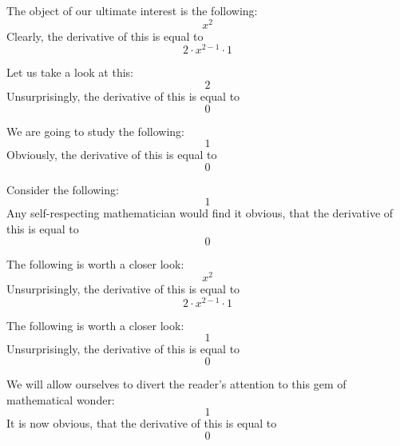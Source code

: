 \documentclass{article}
\begin{document}
The object of our ultimate interest is the following:
\begin{equation}
x ^{2 } 
\end{equation}
Clearly, the derivative of this is equal to
\begin{equation}
2 \cdot x ^{2 - 1 } \cdot 1 
\end{equation}

Let us take a look at this:
\begin{equation}
2 
\end{equation}
Unsurprisingly, the derivative of this is equal to
\begin{equation}
0 
\end{equation}

We are going to study the following:
\begin{equation}
1 
\end{equation}
Obviously, the derivative of this is equal to
\begin{equation}
0 
\end{equation}

Consider the following:
\begin{equation}
1 
\end{equation}
Any self-respecting mathematician would find it obvious, that the derivative of this is equal to
\begin{equation}
0 
\end{equation}

The following is worth a closer look:
\begin{equation}
x ^{2 } 
\end{equation}
Unsurprisingly, the derivative of this is equal to
\begin{equation}
2 \cdot x ^{2 - 1 } \cdot 1 
\end{equation}

The following is worth a closer look:
\begin{equation}
1 
\end{equation}
Unsurprisingly, the derivative of this is equal to
\begin{equation}
0 
\end{equation}

We will allow ourselves to divert the reader's attention to this gem of mathematical wonder:
\begin{equation}
1 
\end{equation}
It is now obvious, that the derivative of this is equal to
\begin{equation}
0 
\end{equation}
\end{document}
